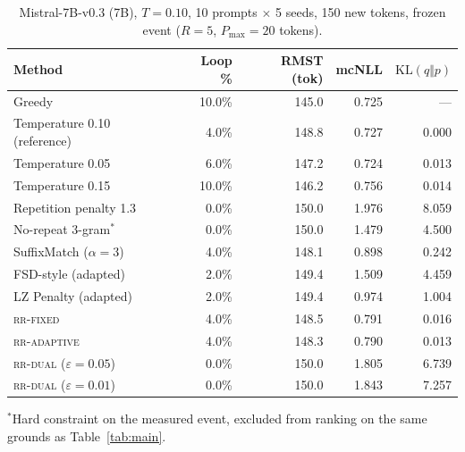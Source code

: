 \documentclass[make,article,submit,pdftex]{Definitions/mdpi}
\providecommand{\KL}{}\renewcommand{\KL}{\mathrm{KL}}
\begin{document}
\begin{table}[H]
\centering
\caption{Mistral-7B-v0.3 (7B), $T{=}0.10$, 10 prompts $\times$ 5 seeds, 150 new tokens, frozen event ($R{=}5$, $P_{\max}{=}20$ tokens).}
\label{tab:mistralfull}
\begin{tabular}{@{}lrrrr@{}}
\toprule
Method & Loop \% & RMST (tok) & mcNLL & $\KL(q\Vert p)$ \\
\midrule
Greedy                      & 10.0\% & 145.0 & 0.725 & --- \\
Temperature 0.10 (reference) & 4.0\%  & 148.8 & 0.727 & 0.000 \\
Temperature 0.05             & 6.0\%  & 147.2 & 0.724 & 0.013 \\
Temperature 0.15             & 10.0\% & 146.2 & 0.756 & 0.014 \\
Repetition penalty 1.3        & 0.0\%  & 150.0 & 1.976 & 8.059 \\
No-repeat 3-gram$^{*}$       & 0.0\%  & 150.0 & 1.479 & 4.500 \\
SuffixMatch ($\alpha{=}3$)    & 4.0\%  & 148.1 & 0.898 & 0.242 \\
FSD-style (adapted)          & 2.0\%  & 149.4 & 1.509 & 4.459 \\
LZ Penalty (adapted)        & 2.0\%  & 149.4 & 0.974 & 1.004 \\
\textsc{rr-fixed}             & 4.0\%  & 148.5 & 0.791 & 0.016 \\
\textsc{rr-adaptive}          & 4.0\%  & 148.3 & 0.790 & 0.013 \\
\textsc{rr-dual} ($\varepsilon{=}0.05$) & 0.0\% & 150.0 & 1.805 & 6.739 \\
\textsc{rr-dual} ($\varepsilon{=}0.01$) & 0.0\% & 150.0 & 1.843 & 7.257 \\
\bottomrule
\end{tabular}

\vspace{4pt}
{\footnotesize $^{*}$Hard constraint on the measured event, excluded from ranking on the same grounds as Table~\ref{tab:main}.}
\end{table}
\end{document}
